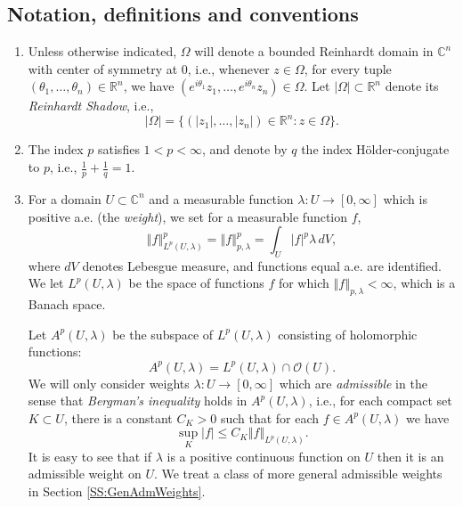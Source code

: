 \documentclass[letterpaper,11pt,reqno]{amsart}
\theoremstyle{plain}
\theoremstyle{definition}
\theoremstyle{remark}
\theoremstyle{remark}
\numberwithin{equation}{section}
\newcommand{\abs}[1]{\left\vert#1\right\vert}
\newcommand{\norm}[1]{\left\Vert#1\right\Vert}
\newcommand{\cx}{{\mathbb C}}
\newcommand{\rl}{\mathbb R}
\begin{document}
\subsection{Notation, definitions and conventions}\label{sec-notation} 
\begin{enumerate}[wide]
\item Unless otherwise indicated, $\Omega$ will denote a bounded Reinhardt domain in $\cx^n$ with center of symmetry at 0, i.e., whenever $z\in \Omega$, for every tuple $(\theta_1,\dots, \theta_n)\in \rl^n$, we have $( e^{i\theta_1}z_1,\dots, e^{i\theta_n}z_n)\in \Omega$. Let $\abs{\Omega}\subset \rl^n$ denote its \emph{Reinhardt Shadow}, i.e., 
\begin{equation*}
\abs{\Omega}= \{ (\abs{z_1},\dots, \abs{z_n})\in \rl^n: z\in \Omega\}.
\end{equation*}
    
\item The index $p$ satisfies $1<p<\infty$, and denote by $q$ the index Hölder-conjugate to $p$, i.e., $\frac{1}{p}+\frac{1}{q}=1.$

\item \label{item-admissible} For a domain $U\subset \cx^n$ and a measurable function $\lambda:U \to [0,\infty]$ which is positive a.e. (the \emph{weight}), we set for a measurable function $f$,
\begin{equation}\label{eq-plambda}
\norm{f}_{L^p(U,\lambda)}^p= \norm{f}_{p,\lambda}^p = \int_{U} \abs{f}^p \lambda \,dV,
\end{equation}
where $dV$ denotes Lebesgue measure, and functions equal a.e. are identified.
We let $L^p(U,\lambda)$ be the space of functions $f$ for which $\norm{f}_{p,\lambda}<\infty$, which is a Banach space.

Let $A^p(U,\lambda)$ be the subspace of $L^p(U,\lambda)$ consisting of holomorphic functions:
\[
A^p(U,\lambda)=L^p(U,\lambda)\cap \mathcal{O}(U). 
\]
We will only consider weights $\lambda:U \to [0,\infty]$ which are \emph{admissible} in the sense that \emph{Bergman's inequality} holds in $A^p(U, \lambda)$, i.e., for each compact set $K\subset U$, there is a constant $C_K>0$ such that for each $f\in A^p(U, \lambda)$ we have 
\begin{equation}\label{eq-bergmanineq}
\sup_K \abs{f}\leq C_K \norm{f}_{L^p(U, \lambda)}.
\end{equation}
It is easy to see  that if $\lambda$ is a positive continuous function on $U$ then it is an admissible weight on $U$.
We treat a class of  more general admissible weights in Section \ref{SS:GenAdmWeights}. 


\end{enumerate}
\end{document}
